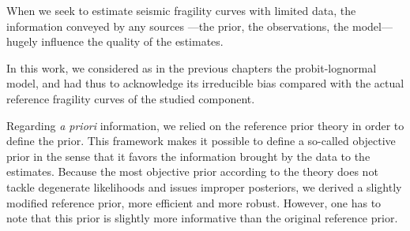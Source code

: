 






When we seek to estimate seismic fragility curves with limited data, 
the information conveyed by any sources ---the prior, the observations, the model--- hugely influence the quality of the estimates.




In this work, we considered as in the previous chapters the probit-lognormal model, and had thus to acknowledge its irreducible bias compared with the actual reference fragility curves of the studied component.

Regarding \emph{a priori} information, we 
relied on the reference prior theory in order to define the prior. This framework makes it possible to define a so-called objective prior in the sense that it favors the information brought by the data to the estimates. Because the
most objective prior according to the theory does not
tackle degenerate likelihoods and issues improper posteriors, we derived a slightly modified reference prior, more efficient and more robust.
However, one has to note that this prior is slightly more informative than the original reference prior.

